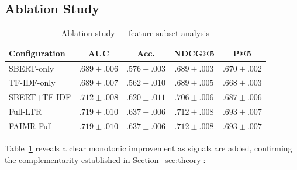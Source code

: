 \documentclass{llncs}
\begin{document}
\subsection{Ablation Study}

\begin{table}[t]
\centering
\caption{Ablation study --- feature subset analysis}
\label{tab:ablation}
\begin{tabular}{lcccc}
\toprule
Configuration & AUC & Acc. & NDCG@5 & P@5 \\
\midrule
SBERT-only      & $.689 \pm .006$ & $.576 \pm .003$ & $.689 \pm .003$ & $.670 \pm .002$ \\
TF-IDF-only     & $.689 \pm .007$ & $.562 \pm .010$ & $.689 \pm .005$ & $.668 \pm .003$ \\
SBERT+TF-IDF    & $.712 \pm .008$ & $.620 \pm .011$ & $.706 \pm .006$ & $.687 \pm .006$ \\
Full-LTR        & $\mathbf{.719 \pm .010}$ & $\mathbf{.637 \pm .006}$ & $\mathbf{.712 \pm .008}$ & $\mathbf{.693 \pm .007}$ \\
FAIMR-Full      & $\mathbf{.719 \pm .010}$ & $\mathbf{.637 \pm .006}$ & $\mathbf{.712 \pm .008}$ & $\mathbf{.693 \pm .007}$ \\
\bottomrule
\end{tabular}
\end{table}

Table~\ref{tab:ablation} reveals a clear monotonic improvement as signals are added, confirming the complementarity established in Section~\ref{sec:theory}:
\end{document}
